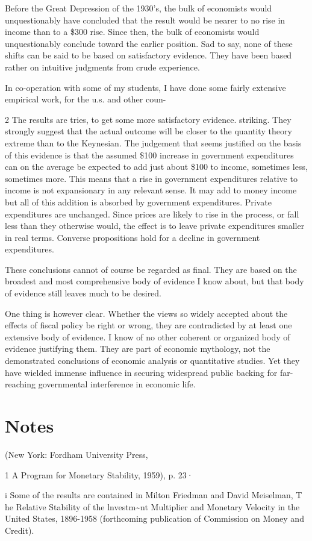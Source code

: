 \documentclass[11pt,openany]{book}
\newcommand{\booknoteshead}{%
  \phantomsection\section*{Notes}%
  \addcontentsline{toc}{section}{Notes}\markright{Notes}}
\begin{document}
Before the Great Depression of the 1930's, the bulk of economists would unquestionably have concluded that the result would be nearer to no rise in income than to a \$300 rise. Since then, the bulk of economists would unquestionably conclude toward the earlier position. Sad to say, none of these shifts can be said to be based on satisfactory evidence. They have been based rather on intuitive judgments from crude experience.

In co-operation with some of my students, I have done some fairly extensive empirical work, for the u.s. and other coun-

2 The results are tries, to get some more satisfactory evidence. striking. They strongly suggest that the actual outcome will be closer to the quantity theory extreme than to the Keynesian. The judgement that seems justified on the basis of this evidence is that the assumed \$100 increase in government expenditures can on the average be expected to add just about \$100 to income, sometimes less, sometimes more. This means that a rise in government expenditures relative to income is not expansionary in any relevant sense. It may add to money income but all of this addition is absorbed by government expenditures. Private expenditures are unchanged. Since prices are likely to rise in the process, or fall less than they otherwise would, the effect is to leave private expenditures smaller in real terms. Converse propositions hold for a decline in government expenditures.

These conclusions cannot of course be regarded as final. They are based on the broadest and most comprehensive body of evidence I know about, but that body of evidence still leaves much to be desired.

One thing is however clear. Whether the views so widely accepted about the effects of fiscal policy be right or wrong, they are contradicted by at least one extensive body of evidence. I know of no other coherent or organized body of evidence justifying them. They are part of economic mythology, not the demonstrated conclusions of economic analysis or quantitative studies. Yet they have wielded immense influence in securing widespread public backing for far-reaching governmental interference in economic life.

\booknoteshead

{\footnotesize\setlength{\parindent}{0pt}\setlength{\parskip}{5pt}

(New York: Fordham University Press,\par

1 A Program for Monetary Stability, 1959), p. 23·\par

i Some of the results are contained in Milton Friedman and David Meiselman, T he Relative Stability of the lnvestm\textasciitilde{}nt Multiplier and Monetary Velocity in the United States, 1896-1958 (forthcoming publication of Commission on Money and Credit).\par

}
\end{document}
